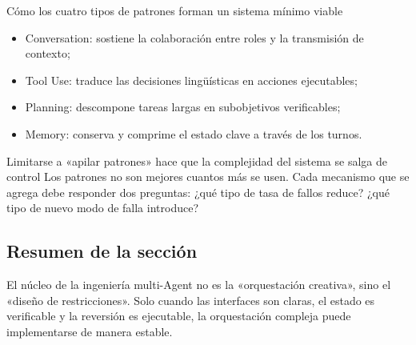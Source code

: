 \begin{knowledgebox}{Cómo los cuatro tipos de patrones forman un sistema mínimo viable}
\begin{itemize}
    \item Conversation: sostiene la colaboración entre roles y la transmisión de contexto;
    \item Tool Use: traduce las decisiones lingüísticas en acciones ejecutables;
    \item Planning: descompone tareas largas en subobjetivos verificables;
    \item Memory: conserva y comprime el estado clave a través de los turnos.
\end{itemize}
\end{knowledgebox}

\begin{warningbox}{Limitarse a «apilar patrones» hace que la complejidad del sistema se salga de control}
Los patrones no son mejores cuantos más se usen. Cada mecanismo que se agrega debe responder dos preguntas:  
¿qué tipo de tasa de fallos reduce? ¿qué tipo de nuevo modo de falla introduce?
\end{warningbox}

\subsection{Resumen de la sección}
El núcleo de la ingeniería multi-Agent no es la «orquestación creativa», sino el «diseño de restricciones». Solo cuando las interfaces son claras, el estado es verificable y la reversión es ejecutable, la orquestación compleja puede implementarse de manera estable.

